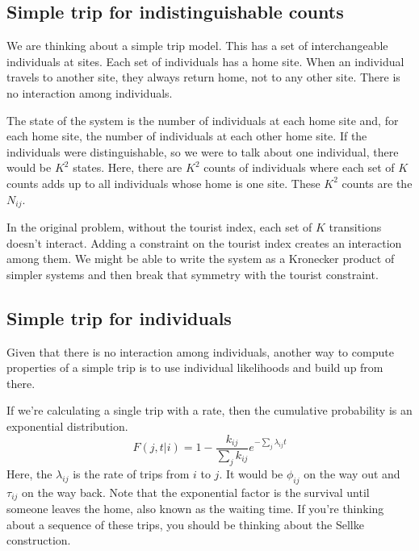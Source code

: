 \documentclass{article}
\begin{document}
\subsection{Simple trip for indistinguishable counts}

We are thinking about a simple trip model. This has a set of interchangeable individuals at sites. Each set of individuals has a home site. When an individual travels to another site, they always return home, not to any other site. There is no interaction among individuals.

The state of the system is the number of individuals at each home site and, for each home site, the number of individuals at each other home site. If the individuals were distinguishable, so we were to talk about one individual, there would be $K^2$ states. Here, there are $K^2$ counts of individuals where each set of $K$ counts adds up to all individuals whose home is one site. These $K^2$ counts are the $N_{ij}$.

In the original problem, without the tourist index, each set of $K$ transitions doesn't interact. Adding a constraint on the tourist index creates an interaction among them. We might be able to write the system as a Kronecker product of simpler systems and then break that symmetry with the tourist constraint.

\subsection{Simple trip for individuals}

Given that there is no interaction among individuals, another way to compute properties of a simple trip is to use individual likelihoods and build up from there.

If we're calculating a single trip with a rate, then the cumulative probability is an exponential distribution.
\begin{equation}
  F(j, t|i) = 1-\frac{k_{ij}}{\sum_jk_{ij}} e^{-\sum_j\lambda_{ij}t}\label{eqn:exponentialsingle}
\end{equation}
Here, the $\lambda_{ij}$ is the rate of trips from $i$ to $j$. It would be $\phi_{ij}$ on the way out and $\tau_{ij}$ on the way back. Note that the exponential factor is the survival until someone leaves the home, also known as the waiting time. If you're thinking about a sequence of these trips, you should be thinking about the Sellke construction.
\end{document}
